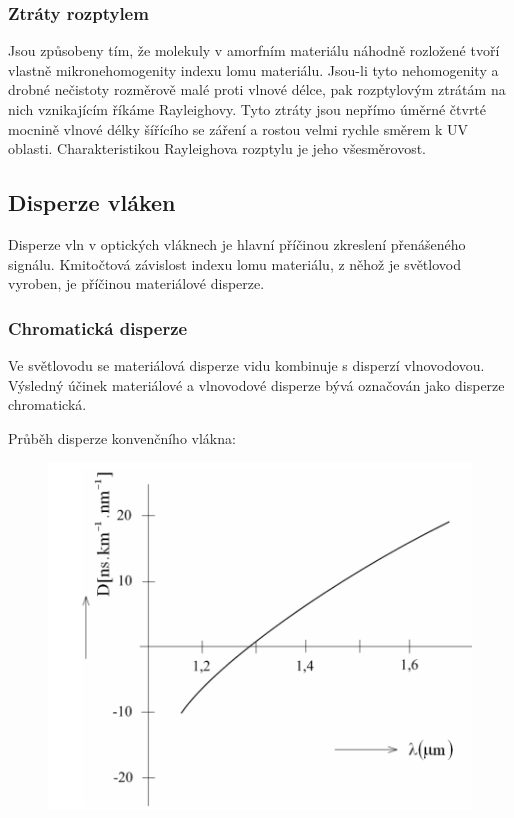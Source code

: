 \subsubsection{Ztráty rozptylem}
Jsou způsobeny tím, že molekuly v amorfním materiálu náhodně rozložené tvoří vlastně mikronehomogenity indexu lomu materiálu. Jsou-li tyto nehomogenity a drobné nečistoty rozměrově malé proti vlnové délce, pak rozptylovým ztrátám na nich vznikajícím říkáme Rayleighovy. Tyto ztráty jsou nepřímo úměrné čtvrté mocnině vlnové délky šířícího se záření a rostou velmi rychle směrem k UV oblasti. Charakteristikou Rayleighova rozptylu je jeho všesměrovost.

\subsection{Disperze vláken}
Disperze vln v optických vláknech je hlavní příčinou zkreslení přenášeného signálu. Kmitočtová závislost indexu lomu materiálu, z něhož je světlovod vyroben, je příčinou materiálové disperze.

\subsubsection{Chromatická disperze}
Ve světlovodu se materiálová disperze vidu kombinuje s disperzí vlnovodovou. Výsledný účinek materiálové a vlnovodové disperze bývá
označován jako disperze chromatická. 

Průběh disperze konvenčního vlákna:
\begin{figure}[!ht]
\begin{center}
    \includegraphics[scale=1]{obrazky/chromdisp1.png}
  \end{center}
\end{figure}

